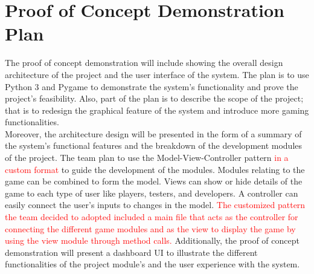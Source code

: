 \documentclass{article}
\begin{document}
\section{Proof of Concept Demonstration Plan}

The proof of concept demonstration will include showing the overall design architecture of the project and the user interface of the system. The plan is to use Python 3 and Pygame to demonstrate the system's functionality and prove the project's feasibility. Also, part of the plan is to describe the scope of the project; that is to redesign the graphical feature of the system and introduce more gaming functionalities. \\
Moreover, the architecture design will be presented in the form of a summary of the system's functional features and the breakdown of the development modules of the project. The team plan to use the Model-View-Controller pattern \textcolor{red}{in a custom format} to guide the development of the modules. Modules relating to the game can be combined to form the model. Views can show or hide details of the game to each type of user like players, testers, and developers. A controller can easily connect the user's inputs to changes in the model. \textcolor{red}{The customized pattern the team decided to adopted included a main file that acts as the controller for connecting the different game modules and as the view to display the game by using the view module through method calls.} Additionally, the proof of concept demonstration will present a dashboard UI to illustrate the different functionalities of the project module's and the user experience with the system.\\
\end{document}
